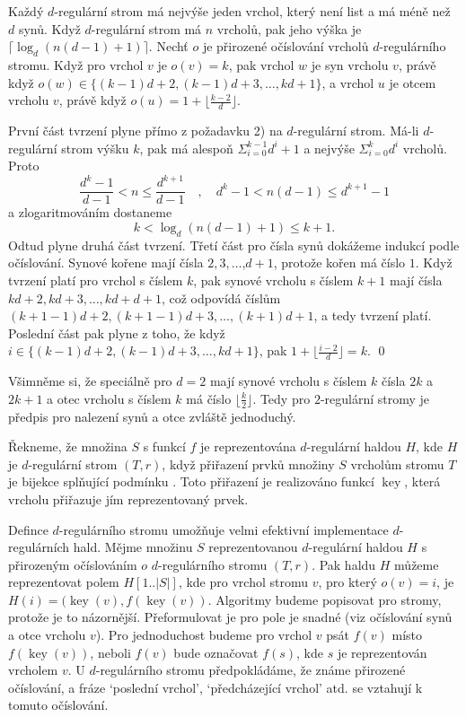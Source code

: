 \documentclass[a4paper,12pt]{article}
\DeclareMathOperator*{\key}{key}
\begin{document}
\begin{tvrzeni}Každý $d$-regulární strom má nejvýše jeden 
vrchol, který není list a má méně než $d$ synů. Když 
$d$-regulární strom má $n$ vrcholů, pak jeho 
výška je $\lceil\log_d(n(d-1)+1)\rceil$. Nechť $o$ je přirozené očíslování 
vrcholů $d$-regulárního stromu. Když pro vrchol 
$v$ je $o(v)=k$, pak vrchol $w$ je syn vrcholu $v$, právě 
když $o(w)\in \{(k-1)d+2,(k-1)d+3,\dots,kd+1\}$, a vrchol $u$ je 
otcem vrcholu $v$, právě když $o(u)=1+\lfloor\frac {k-2}d
\rfloor$. 
\end{tvrzeni}

První část tvrzení plyne přímo z požadavku 2) na 
$d$-regulární strom. Má-li $d$-regulární strom výšku $
k$, 
pak má alespoň $\Sigma_{i=0}^{k-1}d^i+1$ a nejvýše $\Sigma_{
i=0}^kd^i$ 
vrcholů. Proto
$$\frac {d^k-1}{d-1}<n\le\frac {d^{k+1}}{d-1}\quad ,\quad d^k-1<n
(d-1)\le d^{k+1}-1$$
a zlogaritmováním dostaneme
$$k<\log_d(n(d-1)+1)\le k+1.$$
Odtud plyne 
druhá část tvrzení.  Třetí část pro čísla synů dokážeme 
indukcí podle očíslová\-ní.  Synové kořene mají čísla 
$2,3,\dots$,$d+1$,  protože kořen má číslo $1$.  Když tvrzení platí 
pro vrchol s číslem $k$, pak synové vrcholu s číslem $
k+1$ 
mají čísla $kd+2,kd+3,\dots,kd+d+1$, což odpovídá 
číslům $(k+1-1)d+2,(k+1-1)d+3,\dots,(k+1)d+1$, a tedy 
tvrzení platí. Poslední část pak plyne z toho, že když $
i\in \{(k-1)d+2,(k-1)d+3,\dots,kd+1\}$, pak 
$1+\lfloor\frac {i-2}d\rfloor =k$. \qed
\enddemo

Všimněme si, že speciálně pro $d=2$ mají synové vrcholu s číslem $
k$ 
čísla $2k$ a $2k+1$ a otec vrcholu s číslem $k$ má číslo 
$\lfloor\frac k2\rfloor$. Tedy pro $2$-regulární stromy je předpis pro nalezení 
synů a otce zvláště jednoduchý.  

\v Rekneme, že množina $S$ s funkcí $f$ je reprezentována 
$d$-regulár\-ní haldou $H$, kde $H$ je $d$-regulární strom $
(T,r)$, když 
přiřazení prvků množiny $S$ vrcholům stromu 
$T$ je bijekce splňující podmínku . Toto přiřazení 
je realizováno funkcí $\key$, která vrcholu přiřazuje jím 
reprezentovaný prvek.

Defince $d$-regulárního stromu umožňuje velmi efektivní 
implementace $d$-regulárních hald.  Měj\-me množinu $
S$ 
reprezentovanou $d$-regulární haldou $H$ s přirozeným 
očís\-lo\-vá\-ním $o$ $d$-regulární\-ho stromu $
(T,r)$.  Pak haldu $H$ 
můžeme reprezentovat polem $H[1..|S|]$, kde pro vrchol 
stromu $v$, pro který $o(v)=i$, je $H(i)=(\key(v),f(\key(v))$.  Algoritmy 
budeme popisovat pro stromy, protože je to názornější.  
Přeformulovat je pro pole je snadné (viz 
očíslování synů a otce vrcholu $v$).  Pro jednoduchost 
budeme pro vrchol $v$ psát $f(v)$ místo $f(\key(v))$, neboli $
f(v)$ 
bude označovat $f(s)$, kde $s$ je reprezentován vrcholem $v$.  U 
$d$-regulárního stromu předpo\-klá\-dáme, že známe přirozené 
očíslování, a fráze `poslední vrchol', `před\-cházející vrchol' atd.  
se vztahují k tomuto očíslování.  
\end{document}
